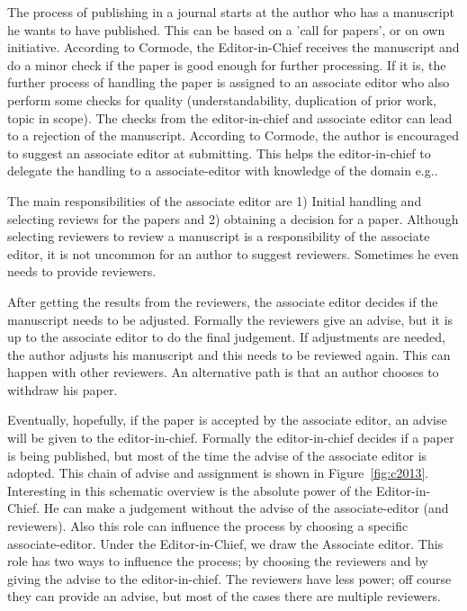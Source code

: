 \documentclass{ou-report}
\begin{document}
The process of publishing in a journal starts at the author who has a manuscript 
he wants to have published. This can be based on a 'call for papers', or on own 
initiative. According to Cormode, the Editor-in-Chief receives the manuscript 
and do a minor check if the paper is good enough for further processing. If it 
is, the further process of handling the paper is assigned to an associate editor 
who also perform some checks for quality (understandability, duplication of 
prior work, topic in scope). The checks from the editor-in-chief and associate 
editor can lead to a rejection of the manuscript. According to Cormode, the 
author is encouraged to suggest an associate editor at submitting. This helps 
the editor-in-chief to delegate the handling to a associate-editor with 
knowledge of the domain e.g..

The main responsibilities of the associate editor are 1) Initial handling and 
selecting reviews for the papers and 2) obtaining a decision for a paper. 
Although selecting reviewers to review a manuscript is a responsibility of the 
associate editor, it is not uncommon for an author to suggest reviewers. 
Sometimes he even needs to provide reviewers.

After getting the results from the reviewers, the associate editor decides if 
the manuscript needs to be adjusted. Formally the reviewers give an advise, but 
it is up to the associate editor to do the final judgement. If adjustments are 
needed, the author adjusts his manuscript and this needs to be reviewed again. 
This can happen with other reviewers. An alternative path is that an author 
chooses to withdraw his paper.

Eventually, hopefully, if the paper is accepted by the associate editor, an 
advise will be given to the editor-in-chief. Formally the editor-in-chief 
decides if a paper is being published, but most of the time the advise of the 
associate editor is adopted. This chain of advise and assignment is shown in 
Figure~\ref{fig:c2013}. Interesting in this schematic overview is the absolute 
power of the Editor-in-Chief. He can make a judgement without the advise of the 
associate-editor (and reviewers). Also this role can influence the process by 
choosing a specific associate-editor. Under the Editor-in-Chief, we draw the 
Associate editor. This role has two ways to influence the process; by choosing 
the reviewers and by giving the advise to the editor-in-chief. The reviewers 
have less power; off course they can provide an advise, but most of the cases 
there are multiple reviewers.
\end{document}
